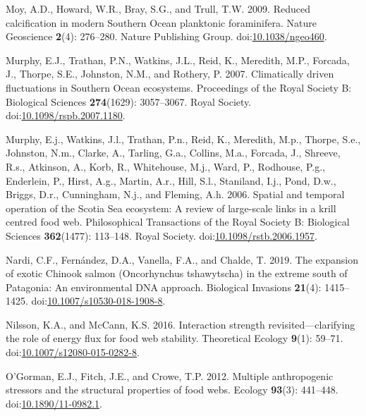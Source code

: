 \documentclass[
]{article}
\newlength{\cslhangindent}
\newenvironment{CSLReferences}[2] %
 {\begin{list}{}{%
  \setlength{\itemindent}{0pt}
  \setlength{\leftmargin}{0pt}
  \setlength{\parsep}{0pt}
  \ifodd #1
   \setlength{\leftmargin}{\cslhangindent}
   \setlength{\itemindent}{-1\cslhangindent}
  \fi
  \setlength{\itemsep}{#2\baselineskip}}}
 {\end{list}}
\begin{document}
\begin{CSLReferences}{1}{0}
Moy, A.D., Howard, W.R., Bray, S.G., and Trull, T.W. 2009. Reduced
calcification in modern {Southern Ocean} planktonic foraminifera. Nature
Geoscience \textbf{2}(4): 276--280. Nature Publishing Group.
doi:\href{https://doi.org/10.1038/ngeo460}{10.1038/ngeo460}.

Murphy, E.J., Trathan, P.N., Watkins, J.L., Reid, K., Meredith, M.P.,
Forcada, J., Thorpe, S.E., Johnston, N.M., and Rothery, P. 2007.
Climatically driven fluctuations in {Southern Ocean} ecosystems.
Proceedings of the Royal Society B: Biological Sciences
\textbf{274}(1629): 3057--3067. Royal Society.
doi:\href{https://doi.org/10.1098/rspb.2007.1180}{10.1098/rspb.2007.1180}.

Murphy, E.j., Watkins, J.l., Trathan, P.n., Reid, K., Meredith, M.p.,
Thorpe, S.e., Johnston, N.m., Clarke, A., Tarling, G.a., Collins, M.a.,
Forcada, J., Shreeve, R.s., Atkinson, A., Korb, R., Whitehouse, M.j.,
Ward, P., Rodhouse, P.g., Enderlein, P., Hirst, A.g., Martin, A.r.,
Hill, S.l., Staniland, I.j., Pond, D.w., Briggs, D.r., Cunningham, N.j.,
and Fleming, A.h. 2006. Spatial and temporal operation of the {Scotia
Sea} ecosystem: A review of large-scale links in a krill centred food
web. Philosophical Transactions of the Royal Society B: Biological
Sciences \textbf{362}(1477): 113--148. Royal Society.
doi:\href{https://doi.org/10.1098/rstb.2006.1957}{10.1098/rstb.2006.1957}.

Nardi, C.F., Fernández, D.A., Vanella, F.A., and Chalde, T. 2019. The
expansion of exotic {Chinook} salmon ({Oncorhynchus} tshawytscha) in the
extreme south of {Patagonia}: An environmental {DNA} approach.
Biological Invasions \textbf{21}(4): 1415--1425.
doi:\href{https://doi.org/10.1007/s10530-018-1908-8}{10.1007/s10530-018-1908-8}.

Nilsson, K.A., and McCann, K.S. 2016. Interaction strength
revisited---clarifying the role of energy flux for food web stability.
Theoretical Ecology \textbf{9}(1): 59--71.
doi:\href{https://doi.org/10.1007/s12080-015-0282-8}{10.1007/s12080-015-0282-8}.

O'Gorman, E.J., Fitch, J.E., and Crowe, T.P. 2012. Multiple
anthropogenic stressors and the structural properties of food webs.
Ecology \textbf{93}(3): 441--448.
doi:\href{https://doi.org/10.1890/11-0982.1}{10.1890/11-0982.1}.


\end{CSLReferences}
\end{document}
